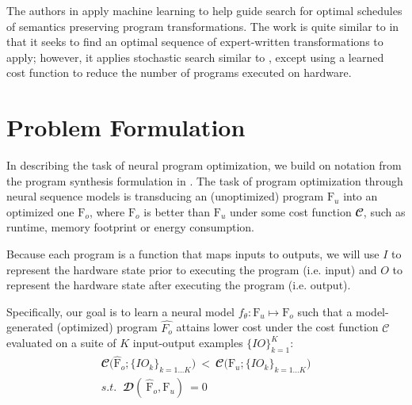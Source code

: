 \documentclass{article}
\begin{document}
The authors in \cite{chen2018learning} apply machine learning to help guide search for optimal schedules of semantics preserving program transformations. The work is quite similar to \cite{chen2019learning} in that it seeks to find an optimal sequence of expert-written transformations to apply; however, it applies stochastic search similar to \cite{schkufza2013stochastic}, except using a learned cost function to reduce the number of programs executed on hardware. 

\section{Problem Formulation}

In describing the task of neural program optimization, we build on notation from the program synthesis formulation in \cite{bunel2018leveraging}. The task of program optimization through neural sequence models is transducing an (unoptimized) program $\text{F}_u$ into an optimized one $\text{F}_o$, where $\text{F}_o$ is better than $\text{F}_u$ under some cost function $\mathbfcal{C}$, such as runtime, memory footprint or energy consumption.

Because each program is a function that maps inputs to outputs, we will use $I$ to represent the hardware state prior to executing the program (i.e. input) and $O$ to represent the hardware state after executing the program (i.e. output).


Specifically, our goal is to learn a neural model $f_{\theta}: \text{F}_u \mapsto \text{F}_o$ such that a model-generated (optimized) program $\hat{F_o}$ attains lower cost under the cost function $\mathcal{C}$ evaluated on a suite of $K$ input-output examples $\{ IO \}_{k=1}^K$:
\begin{equation}
    \label{eqn:optimizaiton_goal}
    \begin{split}
        \mathbfcal{C} \Big(\hat{\textrm{F}}_{o}; \{IO_k\}_{k=1...K} \Big)  \ 
        < \ 
        \mathbfcal{C} \Big(\textrm{F}_{u}; \{IO_k\}_{k=1...K}\Big) \\
         s.t. \;\; \mathbfcal{D}( \ 
                        \hat{\textrm{F}}_{o}, \textrm{F}_{u} ) \ 
                        = 0  %
    \end{split}
\end{equation}
\end{document}

